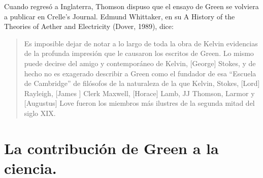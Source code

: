 Cuando regresó a Inglaterra, Thomson dispuso que el ensayo de Green se volviera a publicar en Crelle's Journal. Edmund Whittaker, en su A History of the Theories of Aether and Electricity (Dover, 1989), dice:
\begin{quote}
Es imposible dejar de notar a lo largo de toda la obra de Kelvin evidencias de la profunda impresión que le causaron los escritos de Green. Lo mismo puede decirse del amigo y contemporáneo de Kelvin, [George] Stokes, y de hecho no es exagerado describir a Green como el fundador de esa “Escuela de Cambridge” de filósofos de la naturaleza de la que Kelvin, Stokes, [Lord] Rayleigh, [James ] Clerk Maxwell, [Horace] Lamb, JJ Thomson, Larmor y [Augustus] Love fueron los miembros más ilustres de la segunda mitad del siglo XIX.
\end{quote}

\section{La contribución de Green a la ciencia.}

